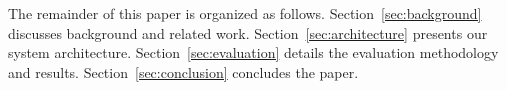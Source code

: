 The remainder of this paper is organized as follows. Section~\ref{sec:background} discusses background and related work. Section~\ref{sec:architecture} presents our system architecture. Section~\ref{sec:evaluation} details the evaluation methodology and results. Section~\ref{sec:conclusion} concludes the paper.

